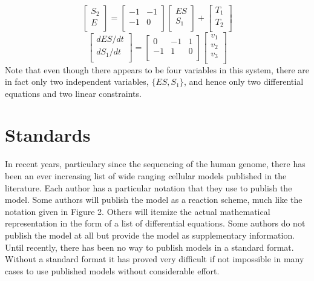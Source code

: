\documentclass[12pt]{article}
\begin{document}
\begin{boxedminipage}[hbp]{14cm}
$$
\left[ \begin{array}{l}
  S_2 \\
  E \\
\end{array} \right] =
\left[ \begin{array}{rr}
  -1 & -1 \\
  -1 & 0 \\
\end{array}  \right]
\left[
\begin{array}{l}
    ES \\
    S_1 \\
\end{array}
\right] +
\left[
\begin{array}{l}
  T_1 \\
  T_2 \\
\end{array}
\right]$$
$$\left[
\begin{array}{l}
  dES/dt \\
  dS_1/dt \\
\end{array}
\right] =
\left[
\begin{array}{rrr}
  0 & -1 & 1 \\
  -1 & 1 & 0 \\
\end{array}
\right]
\left[
\begin{array}{l}
  v_1 \\
  v_2 \\
  v_3 \\
\end{array}
\right]$$ Note that even though there appears to be four variables
in this system, there are in fact only two independent variables, $\{ES, S_1\}$,
and hence only two differential equations and two linear constraints.

\end{boxedminipage}


\section{Standards}

In recent years, particulary since the sequencing of the human
genome, there has been an ever increasing list of wide ranging
cellular models published in the literature. Each author has a
particular notation that they use to publish the model. Some authors
will publish the model as a reaction scheme, much like the
notation given in Figure 2. Others will itemize the actual
mathematical representation in the form of a list of differential
equations. Some authors do not publish the model at all but
provide the model as supplementary information. Until recently,
there has been no way to publish models in a standard format.
Without a standard format it has proved very difficult if not
impossible in many cases to use published models without
considerable effort.
\end{document}
